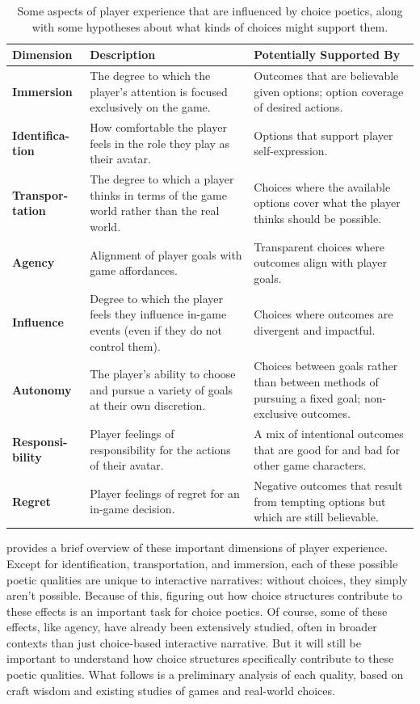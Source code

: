 \begin{table}[!p]
\begingroup
\renewcommand*{\arraystretch}{1.5}
\begin{tabular}{p{5.5em}p{14em}p{13.5em}}
\toprule
\textbf{Dimension} & \textbf{Description} & \textbf{Potentially Supported By} \\
\midrule
\textbf{Immersion} & The degree to which the player's attention is focused exclusively on the game. & Outcomes that are believable given options; option coverage of desired actions. \\
\textbf{Identifica-tion} & How comfortable the player feels in the role they play as their avatar. & Options that support player self-expression. \\
\textbf{Transpor-tation} & The degree to which a player thinks in terms of the game world rather than the real world. & Choices where the available options cover what the player thinks should be possible. \\
\textbf{Agency} & Alignment of player goals with game affordances. & Transparent choices where outcomes align with player goals.\\
\textbf{Influence} & Degree to which the player feels they influence in-game events (even if they do not control them). & Choices where outcomes are divergent and impactful. \\
\textbf{Autonomy} & The player's ability to choose and pursue a variety of goals at their own discretion. & Choices between goals rather than between methods of pursuing a fixed goal; non-exclusive outcomes. \\
\textbf{Responsi-bility} & Player feelings of responsibility for the actions of their avatar. & A mix of intentional outcomes that are good for and bad for other game characters. \\
\textbf{Regret} & Player feelings of regret for an in-game decision. & Negative outcomes that result from tempting options but which are still believable. \\
\bottomrule
\end{tabular}
\endgroup
\caption[Dimensions of player experience]{Some aspects of player experience that are influenced by choice poetics, along with some hypotheses about what kinds of choices might support them.}
\label{tab:dimensions-of-experience}
\end{table}

 provides a brief overview of these important dimensions of player experience.
%
Except for identification, transportation, and immersion, each of these possible poetic qualities are unique to interactive narratives: without choices, they simply aren't possible.
%
Because of this, figuring out how choice structures contribute to these effects 
is an important task for choice poetics.
%
Of course, some of these effects, like agency, have already been extensively studied, often in broader contexts than just choice-based interactive narrative.
%
But it will still be important to understand how choice structures specifically contribute to these poetic qualities.
%
What follows is a preliminary analysis of each quality, based on craft wisdom and existing studies of games and real-world choices.

